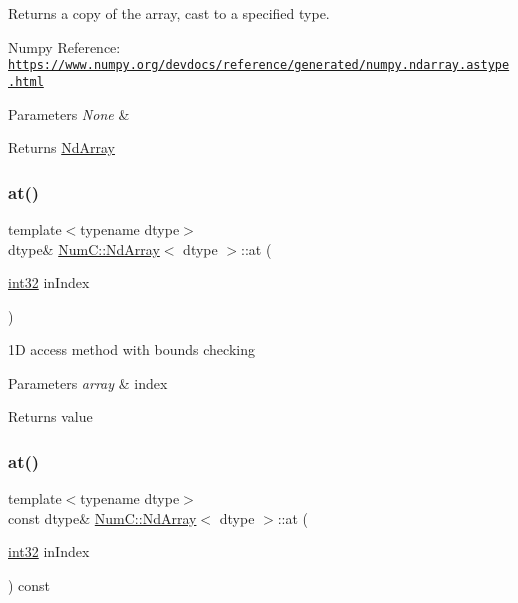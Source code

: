 Returns a copy of the array, cast to a specified type.

Numpy Reference\+: \href{https://www.numpy.org/devdocs/reference/generated/numpy.ndarray.astype.html}{\tt https\+://www.\+numpy.\+org/devdocs/reference/generated/numpy.\+ndarray.\+astype.\+html}


\begin{DoxyParams}{Parameters}
{\em None} & \\
\hline
\end{DoxyParams}
\begin{DoxyReturn}{Returns}
\mbox{\hyperlink{class_num_c_1_1_nd_array}{Nd\+Array}} 
\end{DoxyReturn}
\mbox{\label{class_num_c_1_1_nd_array_ad50a883233561c1b8345678ae5b1480e}} 
\subsubsection{\texorpdfstring{at()}{at()}\hspace{0.1cm}{\footnotesize\ttfamily [1/8]}}
{\footnotesize\ttfamily template$<$typename dtype$>$ \\
dtype\& \mbox{\hyperlink{class_num_c_1_1_nd_array}{Num\+C\+::\+Nd\+Array}}$<$ dtype $>$\+::at (\begin{DoxyParamCaption}\item[{\mbox{\hyperlink{namespace_num_c_aa5a7e69266097d55816d4cdb19542b53}{int32}}}]{in\+Index }\end{DoxyParamCaption})\hspace{0.3cm}{\ttfamily [inline]}}

1D access method with bounds checking


\begin{DoxyParams}{Parameters}
{\em array} & index \\
\hline
\end{DoxyParams}
\begin{DoxyReturn}{Returns}
value 
\end{DoxyReturn}
\mbox{\label{class_num_c_1_1_nd_array_a4d705eda354e6632dd457d3a33456073}} 
\subsubsection{\texorpdfstring{at()}{at()}\hspace{0.1cm}{\footnotesize\ttfamily [2/8]}}
{\footnotesize\ttfamily template$<$typename dtype$>$ \\
const dtype\& \mbox{\hyperlink{class_num_c_1_1_nd_array}{Num\+C\+::\+Nd\+Array}}$<$ dtype $>$\+::at (\begin{DoxyParamCaption}\item[{\mbox{\hyperlink{namespace_num_c_aa5a7e69266097d55816d4cdb19542b53}{int32}}}]{in\+Index }\end{DoxyParamCaption}) const\hspace{0.3cm}{\ttfamily [inline]}}

